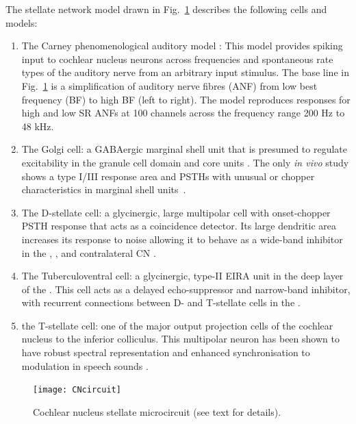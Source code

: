   The stellate network model drawn in
Fig.~\ref{fig:microcircuit} describes the following cells and models:
\begin{enumerate}
\item The Carney phenomenological auditory model
  \citet{ZilanyBruceEtAl:2009}: This model provides spiking input to
  cochlear nucleus neurons across frequencies and spontaneous rate
  types of the auditory nerve from an arbitrary input stimulus. The
  base line in Fig.~\ref{fig:microcircuit} is a simplification of
  auditory nerve fibres (ANF) from low best frequency (BF) to high BF
  (left to right). The model reproduces responses for high and low SR
  ANFs at 100 channels across the frequency range 200 Hz to 48 kHz.
\item The Golgi cell: a GABAergic \VCN marginal shell unit that is presumed to
  regulate excitability in the granule cell domain and core \VCN units
  \citep{FerragamoGoldingEtAl:1998}. The only \textit{in vivo} study shows a type
  I/III response area and PSTHs with unusual or chopper characteristics in
  marginal shell units~\citep{GhoshalKim:1997}.
\item The D-stellate cell: a glycinergic, large multipolar cell with
  onset-chopper PSTH response that acts as a coincidence detector. Its
  large dendritic area increases its response to noise allowing it to
  behave as a wide-band inhibitor in the \VCN, \DCN, and contralateral CN 
  \citep{SmithMassieEtAl:2005,ArnottWallaceEtAl:2004,NeedhamPaolini:2007}.
\item The Tuberculoventral cell: a glycinergic, type-II EIRA unit in the deep
  layer of the \DCN \citep{SpirouDavisEtAl:1999}.  This cell acts as a delayed
  echo-suppressor and narrow-band inhibitor, with recurrent connections between
  D- and T-stellate cells in the \VCN
  \citep{Alibardi:2006,OertelWickesberg:1993,WickesbergWhitlonEtAl:1991}.
\item the T-stellate cell: one of the major output projection cells of the
  cochlear nucleus to the inferior colliculus. This multipolar neuron has been
  shown to have robust spectral representation and enhanced synchronisation to
  modulation in speech sounds
  \citep{BlackburnSachs:1990,KeilsonRichardsEtAl:1997}.
\end{enumerate}

\begin{figure}[ht!]
  \centering
  \texttt{[image: CNcircuit]}
  \caption{Cochlear nucleus stellate microcircuit (see text for details). }
  \label{fig:microcircuit}
\end{figure}

